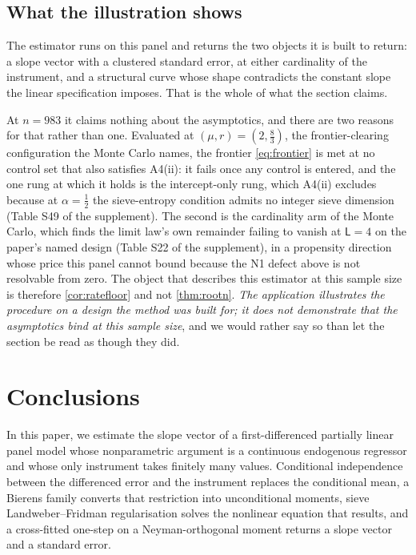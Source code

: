 \documentclass[
  12pt]{article}
\newcommand{\1}[1]{\mathds{1}\left[#1\right]}
\theoremstyle{plain}
\theoremstyle{definition}
\theoremstyle{definition}
\theoremstyle{remark}
\begin{document}
\subsection{What the illustration
shows}\label{what-the-illustration-shows}

The estimator runs on this panel and returns the two objects it is built
to return: a slope vector with a clustered standard error, at either
cardinality of the instrument, and a structural curve whose shape
contradicts the constant slope the linear specification imposes. That is
the whole of what the section claims.

At \(n=983\) it claims nothing about the asymptotics, and there are two
reasons for that rather than one. Evaluated at \((\mu,r)=(2,\tfrac83)\),
the frontier-clearing configuration the Monte Carlo names, the frontier
\eqref{eq:frontier} is met at no control set that also satisfies A4(ii):
it fails once any control is entered, and the one rung at which it holds
is the intercept-only rung, which A4(ii) excludes because at
\(\alpha=\tfrac12\) the sieve-entropy condition admits no integer sieve
dimension (Table S49 of the supplement). The second is the cardinality
arm of the Monte Carlo, which finds the limit law's own remainder
failing to vanish at \(\mathsf L=4\) on the paper's named design (Table
S22 of the supplement), in a propensity direction whose price this panel
cannot bound because the N1 defect above is not resolvable from zero.
The object that describes this estimator at this sample size is
therefore \cref{cor:ratefloor} and not \cref{thm:rootn}. \emph{The
application illustrates the procedure on a design the method was built
for; it does not demonstrate that the asymptotics bind at this sample
size}, and we would rather say so than let the section be read as though
they did.

\section{Conclusions}\label{conclusions}

In this paper, we estimate the slope vector of a first-differenced
partially linear panel model whose nonparametric argument is a
continuous endogenous regressor and whose only instrument takes finitely
many values. Conditional independence between the differenced error and
the instrument replaces the conditional mean, a Bierens family converts
that restriction into unconditional moments, sieve Landweber--Fridman
regularisation solves the nonlinear equation that results, and a
cross-fitted one-step on a Neyman-orthogonal moment returns a slope
vector and a standard error.
\end{document}
